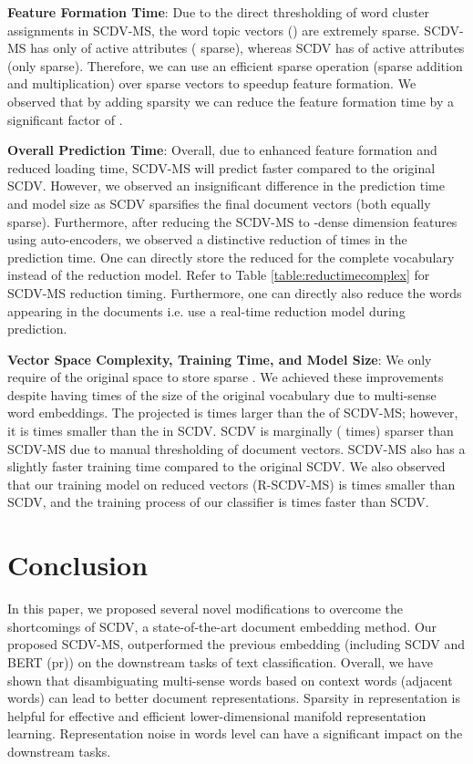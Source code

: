 \documentclass{ecai}
\newcommand{\method}{SCDV-MS}
\begin{document}
\vspace{0.3em}
\noindent \textbf{Feature Formation Time}: Due to the direct thresholding of word cluster assignments in SCDV-MS, the word topic vectors () are extremely sparse. SCDV-MS  has only  of active attributes ( sparse), whereas SCDV  has  of active attributes (only  sparse). Therefore, we can use an efficient sparse operation (sparse addition and multiplication) over sparse vectors to speedup feature formation. We observed that by adding sparsity we can reduce the feature formation time by a significant factor of .

\vspace{0.3em}
\noindent \textbf{Overall Prediction Time}: Overall, due to enhanced feature formation and reduced  loading time, SCDV-MS will predict faster compared to the original SCDV. However, we observed an insignificant difference in the prediction time and model size as SCDV sparsifies the final document vectors (both equally sparse). Furthermore, after reducing the SCDV-MS  to -dense dimension features using auto-encoders, we observed a distinctive reduction of  times in the prediction time. One can directly store the reduced  for the complete vocabulary instead of the reduction model.  Refer to Table \ref{table:reductimecomplex} for SCDV-MS  reduction timing. Furthermore, one can directly also reduce the words appearing in the documents i.e. use a real-time reduction model during prediction.


\vspace{0.3em}
\noindent \textbf{Vector Space Complexity, Training Time, and Model Size}:  We only require  of the original space to store sparse . We achieved these improvements despite having  times of the size of the original vocabulary due to multi-sense word embeddings. The projected  is  times larger than the  of SCDV-MS; however, it is  times smaller than the  in SCDV. SCDV is marginally ( times) sparser than SCDV-MS due to manual thresholding of document vectors. SCDV-MS also has a slightly faster training time compared to the original SCDV. We also observed that our training model on reduced vectors (R-SCDV-MS) is  times smaller than SCDV, and the training process of our classifier is  times faster than SCDV. 

\section{Conclusion}
\label{sec:conclusions}
In this paper, we proposed several novel modifications to overcome the shortcomings of SCDV, a  state-of-the-art document embedding method. Our proposed \method{}, outperformed the previous embedding (including SCDV and BERT (pr)) on the downstream tasks of text classification. Overall, we have shown that disambiguating multi-sense words based on context words (adjacent words) can lead to better document representations. Sparsity in representation is helpful for effective and efficient lower-dimensional manifold representation learning. Representation noise in words level can have a significant impact on the downstream tasks. 




\end{document}
